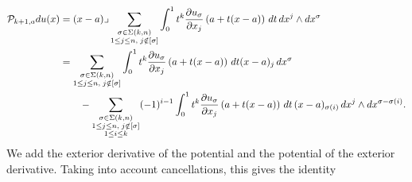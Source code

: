 \documentclass[10pt,a4paper]{article}
\begin{document}
\begin{align*}
    {\mathcal P}_{k+1,a} d u(x)
    &=
    (x-a)\lrcorner 
    \sum_{\substack{ \sigma \in \Sigma(k,n) \\ 1 \leq j \leq n, \; j \notin [\sigma] }}
    \int_{0}^{1} t^{k} \frac{ \partial u_{\sigma} }{\partial x_{j}}\left(a+t(x-a)\right) \,dt 
    \,dx^{j} \wedge dx^{\sigma}
    \\&
    = 
    \sum_{\substack{ \sigma \in \Sigma(k,n) \\ 1 \leq j \leq n, \; j \notin [\sigma] }} 
    \int_{0}^{1} t^{k} \frac{ \partial u_{\sigma} }{\partial x_{j}}\left(a+t(x-a)\right) \,dt (x-a)_{j}
    \,dx^{\sigma} 
    \\&\qquad 
    - 
    \sum_{\substack{ \sigma \in \Sigma(k,n) \\ 1 \leq j \leq n, \; j \notin [\sigma] \\ 1 \leq i \leq k }}
    (-1)^{i-1}
    \int_{0}^{1} t^{k} \frac{ \partial u_{\sigma} }{\partial x_{j}}\left(a+t(x-a)\right) \,dt 
    \,(x-a)_{\sigma(i)} 
    \,dx^{j} \wedge dx^{\sigma-\sigma(i)}
    .
\end{align*}
We add the exterior derivative of the potential and the potential of the exterior derivative.
Taking into account cancellations, this gives the identity 
\begingroup\allowdisplaybreaks
\end{document}
